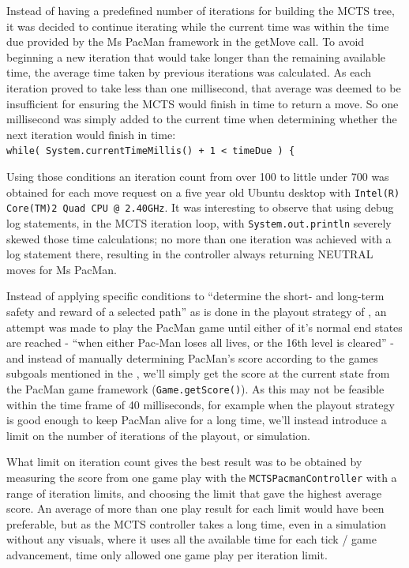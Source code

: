 \documentclass[conference]{IEEEtran}
\begin{document}
Instead of having a predefined number of iterations for building the MCTS tree, it was decided to continue iterating while the current time was within the time due provided by the Ms PacMan framework in the getMove call.  To avoid beginning a new iteration that would take longer than the remaining available time, the average time taken by previous iterations was calculated.  As each iteration proved to take less than one millisecond, that average was deemed to be insufficient for ensuring the MCTS would finish in time to return a move.  So one millisecond was simply added to the current time when determining whether the next iteration would finish in time:\\
\texttt{while( System.currentTimeMillis() + 1 < timeDue ) \{}

Using those conditions an iteration count from over 100 to little under 700 was obtained for each move request on a five year old Ubuntu desktop with \texttt{Intel(R) Core(TM)2 Quad CPU @ 2.40GHz}.  It was interesting to observe that using debug log statements, in the MCTS iteration loop, with \texttt{System.out.println} severely skewed those time calculations; no more than one iteration was achieved with a log statement there, resulting in the controller always returning NEUTRAL moves for Ms PacMan.

Instead of applying specific conditions to “determine the short- and long-term safety and reward of a selected path” as is done in the playout strategy of \cite{pepels2012enhancements}, an attempt was made to play the PacMan game until either of it’s normal end states are reached - “when either Pac-Man loses all lives, or the 16th level is cleared”\cite{pepels2012enhancements} - and instead of manually determining PacMan’s score according to the games subgoals mentioned in the \cite{pepels2012enhancements}, we’ll simply get the score at the current state from the PacMan game framework (\texttt{Game.getScore()}).  As this may not be feasible within the time frame of 40 milliseconds, for example when the playout strategy is good enough to keep PacMan alive for a long time, we’ll instead introduce a limit on the number of iterations of the playout, or simulation.

What limit on iteration count gives the best result was to be obtained by measuring the score from one game play with the \texttt{MCTSPacmanController} with a range of iteration limits, and choosing the limit that gave the highest average score.  An average of more than one play result for each limit would have been preferable, but as the MCTS controller takes a long time, even in a simulation without any visuals, where it uses all the available time for each tick / game advancement, time only allowed one game play per iteration limit.
\end{document}
